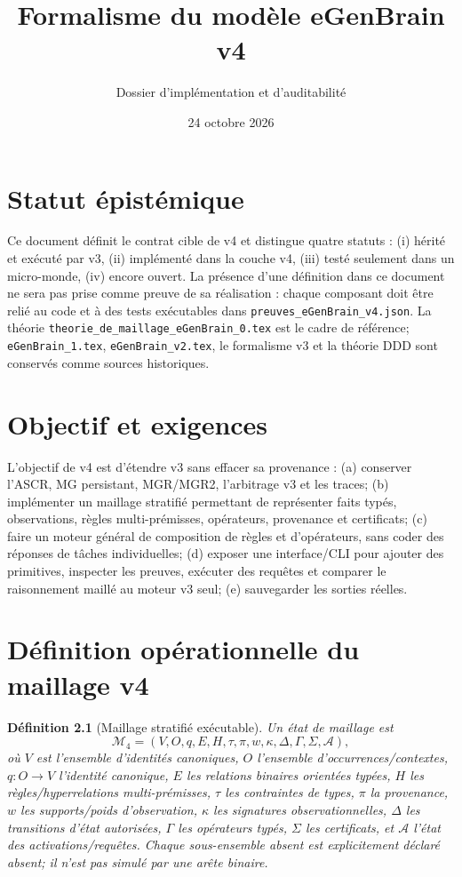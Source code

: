 \documentclass[11pt,a4paper]{book}
\title{Formalisme du modèle eGenBrain v4}
\author{Dossier d'implémentation et d'auditabilité}
\date{24 octobre 2026}
\newtheorem{definition}{Définition}[chapter]
\begin{document}
\frontmatter
\maketitle
\chapter*{Statut épistémique}
Ce document définit le contrat cible de v4 et distingue quatre statuts : (i) hérité et exécuté par v3, (ii) implémenté dans la couche v4, (iii) testé seulement dans un micro-monde, (iv) encore ouvert. La présence d'une définition dans ce document ne sera pas prise comme preuve de sa réalisation : chaque composant doit être relié au code et à des tests exécutables dans \texttt{preuves\_eGenBrain\_v4.json}. La théorie \texttt{theorie\_de\_maillage\_eGenBrain\_0.tex} est le cadre de référence; \texttt{eGenBrain\_1.tex}, \texttt{eGenBrain\_v2.tex}, le formalisme v3 et la théorie DDD sont conservés comme sources historiques.
\tableofcontents
\mainmatter
\chapter{Objectif et exigences}
L'objectif de v4 est d'étendre v3 sans effacer sa provenance : (a) conserver l'ASCR, MG persistant, MGR/MGR2, l'arbitrage v3 et les traces; (b) implémenter un maillage stratifié permettant de représenter faits typés, observations, règles multi-prémisses, opérateurs, provenance et certificats; (c) faire un moteur général de composition de règles et d'opérateurs, sans coder des réponses de tâches individuelles; (d) exposer une interface/CLI pour ajouter des primitives, inspecter les preuves, exécuter des requêtes et comparer le raisonnement maillé au moteur v3 seul; (e) sauvegarder les sorties réelles.

\chapter{Définition opérationnelle du maillage v4}
\begin{definition}[Maillage stratifié exécutable]
Un état de maillage est
\[
\mathcal M_4=(V,O,q,E,H,\tau,\pi,w,\kappa,\Delta,\Gamma,\Sigma,\mathcal A),
\]
où $V$ est l'ensemble d'identités canoniques, $O$ l'ensemble d'occurrences/contextes, $q:O\to V$ l'identité canonique, $E$ les relations binaires orientées typées, $H$ les règles/hyperrelations multi-prémisses, $\tau$ les contraintes de types, $\pi$ la provenance, $w$ les supports/poids d'observation, $\kappa$ les signatures observationnelles, $\Delta$ les transitions d'état autorisées, $\Gamma$ les opérateurs typés, $\Sigma$ les certificats, et $\mathcal A$ l'état des activations/requêtes. Chaque sous-ensemble absent est explicitement déclaré absent; il n'est pas simulé par une arête binaire.
\end{definition}
\end{document}
